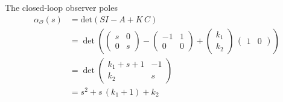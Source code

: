 The closed-loop observer poles 
\begin{align*}
    \alpha_\mathcal{O}(s) &= \text{det}\left(SI - A + K\,C\right) \\
    &=  \det\left(\begin{pmatrix}
        s & 0 \\ 0 & s 
        \end{pmatrix} - \begin{pmatrix}
        -1 & 1 \\ 0 & 0
    \end{pmatrix} + \begin{pmatrix}
        k_1 \\ k_2
    \end{pmatrix}\,\begin{pmatrix}
        1 & 0
    \end{pmatrix}\right)\\
    &= \det\begin{pmatrix}
        k_1 + s + 1 & -1 \\ k_2 & s
    \end{pmatrix} \\
    &= s^2 + s\,\left(k_1 + 1\right) + k_2
\end{align*}